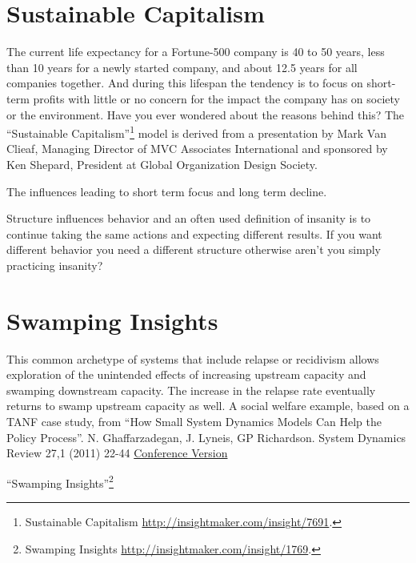 \documentclass[]{memoir}
\begin{document}
\section{Sustainable Capitalism}

The current life expectancy for a Fortune-500 company is 40 to 50 years,
less than 10 years for a newly started company, and about 12.5 years for
all companies together. And during this lifespan the tendency is to
focus on short-term profits with little or no concern for the impact the
company has on society or the environment. Have you ever wondered about
the reasons behind this? The ``Sustainable Capitalism''\footnote{Sustainable
  Capitalism \url{http://insightmaker.com/insight/7691}.} model is
derived from a presentation by Mark Van Clieaf, Managing Director of MVC
Associates International and sponsored by Ken Shepard, President at
Global Organization Design Society.

\FloatBarrier 

\begin{model}[frametitle={Model: Sustainable Capitalism}] 

 The influences leading to short term focus and long term decline.




 \end{model}

Structure influences behavior and an often used definition of insanity
is to continue taking the same actions and expecting different results.
If you want different behavior you need a different structure otherwise
aren't you simply practicing insanity?

\section{Swamping Insights}

This common archetype of systems that include relapse or recidivism
allows exploration of the unintended effects of increasing upstream
capacity and swamping downstream capacity. The increase in the relapse
rate eventually returns to swamp upstream capacity as well. A social
welfare example, based on a TANF case study, from ``How Small System
Dynamics Models Can Help the Policy Process''. N. Ghaffarzadegan, J.
Lyneis, GP Richardson. System Dynamics Review 27,1 (2011) 22-44
\href{http://www.systemdynamics.org/conferences/2009/proceed/papers/P1388.pdf}{Conference
Version}

``Swamping Insights''\footnote{Swamping Insights
  \url{http://insightmaker.com/insight/1769}.}
\end{document}
